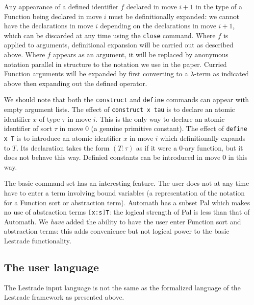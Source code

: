 \documentclass[12pt]{article}
\begin{document}
Any appearance of a defined identifier $f$ declared in move $i+1$ in the type of a Function being declared in move $i$ must be definitionally expanded:  we cannot have the declarations in move $i$ depending on the declarations in move $i+1$, which can be discarded at any time using the {\tt close} command.  Where $f$ is applied to arguments, definitional expansion will be carried out as described above.  Where $f$ appears as an argument, it will be replaced by anonymous notation parallel in structure to the notation we use in the paper.  Curried Function arguments will be expanded by first converting to a $\lambda$-term as indicated above then expanding out the defined operator.

We should note that both the {\tt construct} and {\tt define} commands can appear with empty argument lists.  The effect of {\tt construct x tau} is to declare an atomic identifier $x$ of type $\tau$ in move $i$.  This is the only way to declare an atomic identifier of sort $\tau$ in move 0 (a genuine primitive constant).   The effect of {\tt define x T} is to introduce an atomic identifier $x$ in move $i$ which definitionally expands to $T$.  Its declaration takes the form $(T:\tau)$ as if it were a 0-ary function, but it does not behave this way.  Definied constants can be introduced in move 0 in this way.

The basic command set has an interesting feature.  The user does not at any time have to enter a term involving bound variables (a representation of the notation for a Function sort or abstraction term).  Automath has a subset Pal which makes no use of abstraction terms {\tt [x:s]T}:  the logical strength of Pal is less than that of Automath.  We {\em have\/} added the ability to have the user enter Function sort and abstraction terms:  this adds convenience but not logical power to the basic Lestrade functionality.

\subsection{The user language}

The Lestrade input language is not the same as the formalized language of the Lestrade framework as presented above.
\end{document}
